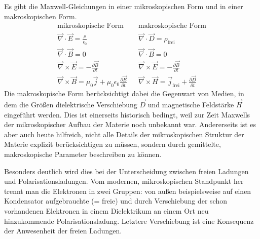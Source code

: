 Es gibt die Maxwell-Gleichungen in einer mikroskopischen Form und in einer makroskopischen Form.
%
\begin{align}
\text{mikroskopische Form} & &
\text{makroskopische Form} \nonumber \\
%
 \vec\nabla\cdot\vec{E}= \frac{\rho}{\epsilon_0} & &
 \vec\nabla\cdot\vec{D}= \rho_{\text{frei}} \\
%
\vec\nabla\cdot\vec{B}=0
 & &
\vec\nabla\cdot\vec{B}=0 \\
%
\vec\nabla\times\vec{E}=-\frac{\partial\vec{B}}{\partial t}  
& &
\vec\nabla\times\vec{E}=-\frac{\partial\vec{B}}{\partial t} \\
%
\vec\nabla\times\vec{B}= \mu_0\vec{j}+\mu_0\epsilon_0\frac{\partial\vec{E}}{\partial t}  & &
\vec\nabla\times\vec{H}= \vec{j}_{\text{frei}}+\frac{\partial\vec{D}}{\partial t}
\end{align}
%
Die makroskopische Form berücksichtigt dabei die Gegenwart von Medien, in dem die Größen dielektrische Verschiebung $\vec{D}$ und magnetische Feldstärke $\vec{H}$ eingeführt werden. Dies ist einerseits historisch bedingt, weil zur Zeit Maxwells der mikroskopischer Aufbau der Materie noch unbekannt war. Andererseits ist es aber auch heute hilfreich, nicht alle Details der mikroskopischen Struktur der Materie explizit berücksichtigen zu müssen, sondern durch gemittelte, makroskopische Parameter beschreiben zu können.

Besonders deutlich wird dies bei der Unterscheidung zwischen freien Ladungen und Polarisationsladungen.  Vom modernen, mikroskopischen Standpunkt her trennt man die Elektronen in zwei Gruppen: von außen beispielsweise auf einen Kondensator aufgebrauchte (= freie) und durch Verschiebung der schon vorhandenen Elektronen in einem Dielektrikum an einem Ort neu hinzukommende Polarisationsladung. Letztere Verschiebung ist eine Konsequenz der Anwesenheit der freien Ladungen.

